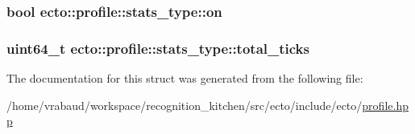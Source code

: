 \subsubsection[{\texorpdfstring{on}{on}}]{\setlength{\rightskip}{0pt plus 5cm}bool ecto\+::profile\+::stats\+\_\+type\+::on}\hypertarget{structecto_1_1profile_1_1stats__type_a25c84366176dc49eb9b113a4e74c6b5a}{}\label{structecto_1_1profile_1_1stats__type_a25c84366176dc49eb9b113a4e74c6b5a}
\subsubsection[{\texorpdfstring{total\+\_\+ticks}{total_ticks}}]{\setlength{\rightskip}{0pt plus 5cm}uint64\+\_\+t ecto\+::profile\+::stats\+\_\+type\+::total\+\_\+ticks}\hypertarget{structecto_1_1profile_1_1stats__type_affa2973693dec71733bcf8f7b6cf9c0b}{}\label{structecto_1_1profile_1_1stats__type_affa2973693dec71733bcf8f7b6cf9c0b}


The documentation for this struct was generated from the following file\+:\begin{DoxyCompactItemize}
\item 
/home/vrabaud/workspace/recognition\+\_\+kitchen/src/ecto/include/ecto/\hyperlink{profile_8hpp}{profile.\+hpp}\end{DoxyCompactItemize}
